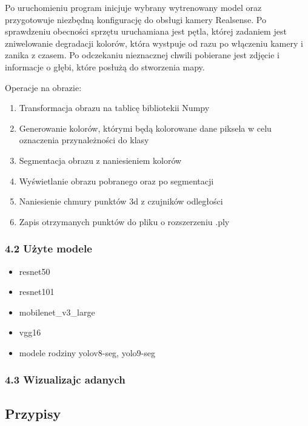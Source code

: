 \documentclass[
]{article}
\providecommand{\tightlist}{%
  \setlength{\itemsep}{0pt}\setlength{\parskip}{0pt}}
\begin{document}
Po uruchomieniu program inicjuje wybrany wytrenowany model oraz przygotowuje niezbędną konfigurację do obsługi kamery Realsense. Po sprawdzeniu obecności sprzętu uruchamiana jest pętla, której zadaniem jest zniwelowanie degradacji kolorów, która wystpuje od razu po włączeniu kamery i zanika z czasem. Po odczekaniu nieznacznej chwili pobierane jest zdjęcie i informacje o głębi, które posłużą do stworzenia mapy.

Operacje na obrazie:

\begin{enumerate}
\def\labelenumi{\arabic{enumi}.}
\tightlist
\item
  Transformacja obrazu na tablicę bibliotekii Numpy
\item
  Generowanie kolorów, którymi będą kolorowane dane piksela w celu oznaczenia przynależności do klasy
\item
  Segmentacja obrazu z naniesieniem kolorów
\item
  Wyświetlanie obrazu pobranego oraz po segmentacji
\item
  Naniesienie chmury punktów 3d z czujników odległości
\item
  Zapis otrzymanych punktów do pliku o rozszerzeniu .ply
\end{enumerate}

\subsubsection{4.2 Użyte modele}\label{uux17cyte-modele}

\begin{itemize}
\tightlist
\item
  resnet50
\item
  resnet101
\item
  mobilenet\_v3\_large
\item
  vgg16
\item
  modele rodziny yolov8-seg, yolo9-seg
\end{itemize}

\subsubsection{4.3 Wizualizajc adanych}\label{wizualizajc-adanych}

\subsection{Przypisy}\label{przypisy}
\end{document}
